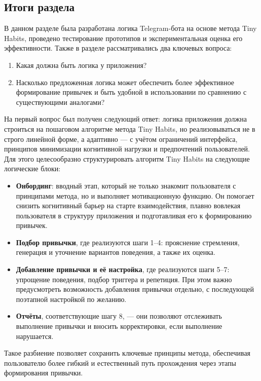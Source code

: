 \documentclass[pdflatex,sn-mathphys-num]{sn-jnl}%
\theoremstyle{thmstyleone}%
\theoremstyle{thmstyletwo}%
\theoremstyle{thmstylethree}%
\begin{document}
\subsection{Итоги раздела}

В данном разделе была разработана логика Telegram-бота на основе метода Tiny Habits, проведено тестирование прототипов и экспериментальная оценка его эффективности. Также в разделе рассматривались два ключевых вопроса:

\begin{enumerate}
    \item Какая должна быть логика у приложения?
    \item Насколько предложенная логика может обеспечить более эффективное формирование привычек и быть удобной в использовании по сравнению с существующими аналогами?
\end{enumerate}

На первый вопрос был получен следующий ответ: логика приложения должна строиться на пошаговом алгоритме метода Tiny Habits, но реализовываться не в строго линейной форме, а адаптивно — с учётом ограничений интерфейса, принципов минимизации когнитивной нагрузки и предпочтений пользователей. Для этого целесообразно структурировать алгоритм Tiny Habits на следующие логические блоки:

\begin{itemize}
    \item \textbf{Онбординг}: вводный этап, который не только знакомит пользователя с принципами метода, но и выполняет мотивационную функцию. Он помогает снизить когнитивный барьер на старте взаимодействия, плавно вовлекая пользователя в структуру приложения и подготавливая его к формированию привычек.
    \item \textbf{Подбор привычки}, где реализуются шаги 1–4: прояснение стремления, генерация и уточнение вариантов поведения, а также их оценка.
    \item \textbf{Добавление привычки и её настройка}, где реализуются шаги 5–7: упрощение поведения, подбор триггера и репетиция. При этом важно предусмотреть возможность добавления привычки отдельно, с последующей поэтапной настройкой по желанию.
    \item \textbf{Отчёты}, соответствующие шагу 8, — они позволяют отслеживать выполнение привычки и вносить корректировки, если выполнение нарушается.
\end{itemize}

Такое разбиение позволяет сохранить ключевые принципы метода, обеспечивая пользователю более гибкий и естественный путь прохождения через этапы формирования привычки.
\end{document}
